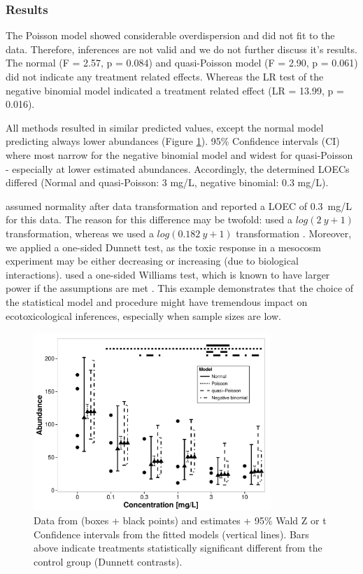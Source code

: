 \documentclass{scrartcl}
\begin{document}
\subsubsection{Results}
The Poisson model showed considerable overdispersion and did not fit to the data. Therefore, inferences are not valid and we do not further discuss it's results. 
The normal (F = 2.57, p = 0.084) and quasi-Poisson model (F = 2.90, p = 0.061) did not indicate any treatment related effects.
Whereas the LR test of the negative binomial model indicated a treatment related effect (LR = 13.99, p = 0.016).

All methods resulted in similar predicted values, except the normal model predicting always lower abundances (Figure \ref{fig:example}). 
95\% Confidence intervals (CI) where most narrow for the negative binomial model and widest for quasi-Poisson - especially at lower estimated abundances.
Accordingly, the determined LOECs differed (Normal and quasi-Poisson: 3 mg/L, negative binomial: 0.3 mg/L).

\citet{brock_minimum_2014} assumed normality after data transformation and reported a LOEC of \mbox{0.3 mg/L} for this data.
The reason for this difference may be twofold: \citep{brock_minimum_2014} used a $log(2~y + 1)$ transformation, whereas we used a $log(0.182~y + 1)$ transformation \citep{van_den_brink_impact_2000}.
Moreover, we applied a one-sided Dunnett test, as the toxic response in a mesocosm experiment may be either decreasing or increasing (due to biological interactions).
\citet{brock_minimum_2014} used a one-sided Williams test, which is known to have larger power if the assumptions are met \citep{jaki_statistical_2013}.
This example demonstrates that the choice of the statistical model and procedure might have tremendous impact on ecotoxicological inferences, especially when sample sizes are low.

\begin{figure}[h]
  \centering
  \includegraphics[width = 0.8\textwidth]{example.pdf}
  \caption{Data from \citet{brock_minimum_2014} (boxes + black points) and estimates + 95\% Wald Z or t Confidence intervals from the fitted models (vertical lines). 
  Bars above indicate treatments statistically significant different from the control group (Dunnett contrasts).}
  \label{fig:example}
\end{figure}
\end{document}
